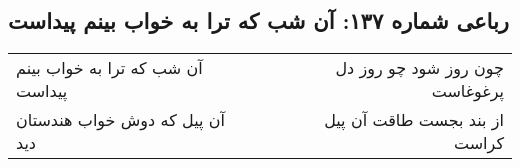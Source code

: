 \begin{center}
\section*{رباعی شماره ۱۳۷: آن شب که ترا به خواب بینم پیداست}
\label{sec:0137}
\begin{longtable}{l p{0.5cm} r}
آن شب که ترا به خواب بینم پیداست
&&
چون روز شود چو روز دل پرغوغاست
\\
آن پیل که دوش خواب هندستان دید
&&
از بند بجست طاقت آن پیل کراست
\\
\end{longtable}
\end{center}
